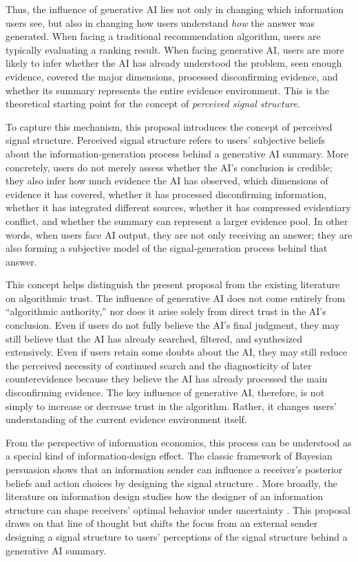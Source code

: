 Thus, the influence of generative AI lies not only in changing which information users see, but also in changing how users understand \emph{how} the answer was generated. When facing a traditional recommendation algorithm, users are typically evaluating a ranking result. When facing generative AI, users are more likely to infer whether the AI has already understood the problem, seen enough evidence, covered the major dimensions, processed disconfirming evidence, and whether its summary represents the entire evidence environment. This is the theoretical starting point for the concept of \emph{perceived signal structure}.

To capture this mechanism, this proposal introduces the concept of perceived signal structure. Perceived signal structure refers to users' subjective beliefs about the information-generation process behind a generative AI summary. More concretely, users do not merely assess whether the AI's conclusion is credible; they also infer how much evidence the AI has observed, which dimensions of evidence it has covered, whether it has processed disconfirming information, whether it has integrated different sources, whether it has compressed evidentiary conflict, and whether the summary can represent a larger evidence pool. In other words, when users face AI output, they are not only receiving an answer; they are also forming a subjective model of the signal-generation process behind that answer.

This concept helps distinguish the present proposal from the existing literature on algorithmic trust. The influence of generative AI does not come entirely from ``algorithmic authority,'' nor does it arise solely from direct trust in the AI's conclusion. Even if users do not fully believe the AI's final judgment, they may still believe that the AI has already searched, filtered, and synthesized extensively. Even if users retain some doubts about the AI, they may still reduce the perceived necessity of continued search and the diagnosticity of later counterevidence because they believe the AI has already processed the main disconfirming evidence. The key influence of generative AI, therefore, is not simply to increase or decrease trust in the algorithm. Rather, it changes users' understanding of the current evidence environment itself.

From the perspective of information economics, this process can be understood as a special kind of information-design effect. The classic framework of Bayesian persuasion shows that an information sender can influence a receiver's posterior beliefs and action choices by designing the signal structure \citep{KamenicaGentzkow2011}. More broadly, the literature on information design studies how the designer of an information structure can shape receivers' optimal behavior under uncertainty \citep{BergemannMorris2019}. This proposal draws on that line of thought but shifts the focus from an external sender designing a signal structure to users' perceptions of the signal structure behind a generative AI summary.

